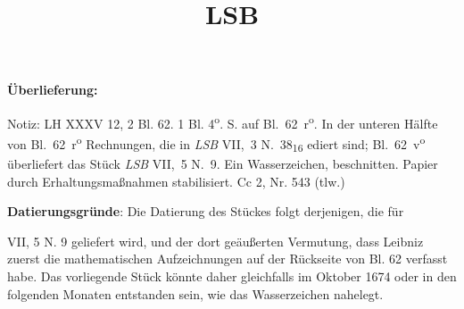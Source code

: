       
               
                \begin{ledgroupsized}[r]{120mm}
                \footnotesize 
                \pstart                
                \noindent\textbf{\"{U}berlieferung:}   
                \pend
                \end{ledgroupsized}
            
              
                            \begin{ledgroupsized}[r]{114mm}
                            \footnotesize 
                            \pstart \parindent -6mm
                            Notiz: LH XXXV 12, 2 Bl. 62. 1 Bl. 4\textsuperscript{o}.  S. auf Bl.~62~r\textsuperscript{o}. In der unteren Hälfte von Bl.~62~r\textsuperscript{o} Rechnungen, die in \textit{LSB} VII,~3 N.~38\textsubscript{16} ediert sind; Bl.~62~v\textsuperscript{o} überliefert das Stück \textit{LSB} VII,~5 N.~9. Ein Wasserzeichen, beschnitten. Papier durch Erhaltungsmaßnahmen stabilisiert.%
\newline%
Cc 2, Nr. 543 (tlw.)%
\pend%
                            \end{ledgroupsized}
                \vspace*{5mm}
                \begin{ledgroup}
                \footnotesize 
                \pstart
            \noindent\footnotesize{\textbf{Datierungsgr\"{u}nde}: Die Datierung des St\"{u}ckes folgt derjenigen, die f\"{u}r \title[115]{LSB} VII, 5 N. 9 geliefert wird, und der dort geäußerten Vermutung, dass Leibniz zuerst die mathematischen Aufzeich\-nungen auf der R\"{u}ckseite von Bl. 62 verfasst habe. Das vorliegende St\"{u}ck k\"{o}nnte daher gleichfalls im Oktober 1674 oder in den folgenden Monaten entstanden sein, wie das Wasserzeichen nahelegt.}
                \pend
                \end{ledgroup}
            
